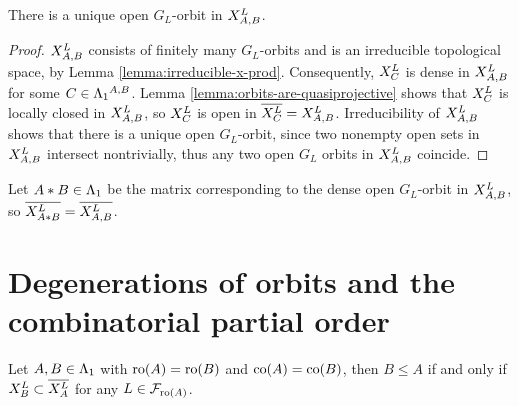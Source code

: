 \documentclass[a4paper, 11pt]{report}
\begin{document}
\begin{proposition}\label{prop:open-orbit-x-prod}
There is a unique open $G_L$-orbit in $\xprod[L]{A,B}$.
\end{proposition}

\begin{proof}
$\xprod[L]{A,B}$ consists of finitely many $G_L$-orbits and is an irreducible topological space, by Lemma \ref{lemma:irreducible-x-prod}. Consequently, $\xprod[L]{C}$ is dense in $\xprod[L]{A,B}$ for some $C\in\matrices^{A,B}$. Lemma \ref{lemma:orbits-are-quasiprojective} shows that $\xprod[L]{C}$ is locally closed in $\xprod[L]{A,B}$, so $\xprod[L]{C}$ is open in $\overline{\xprod[L]{C}}=\xprod[L]{A,B}$. Irreducibility of $\xprod[L]{A,B}$ shows that there is a unique open $G_L$-orbit, since two nonempty open sets in $\xprod[L]{A,B}$ intersect nontrivially, thus any two open $G_L$ orbits in $\xprod[L]{A,B}$ coincide.
\end{proof}

Let $A\ast B\in\matrices$ be the matrix corresponding to the dense open $G_L$-orbit in $\xprod[L]{A,B}$, so $\overline{\xprod[L]{A\ast B}}=\overline{\xprod[L]{A,B}}$.

\section{Degenerations of orbits and the combinatorial partial order}

\begin{theorem}\label{theorem:compare-partial-orders}
Let $A,B\in\matrices$ with $\ro{A}=\ro{B}$ and $\co{A}=\co{B}$, then $B\le A$ if and only if $\xprod[L]{B}\subset\overline{\xprod[L]{A}}$ for any $L\in\flags_{\ro{A}}$.
\end{theorem}
\end{document}
